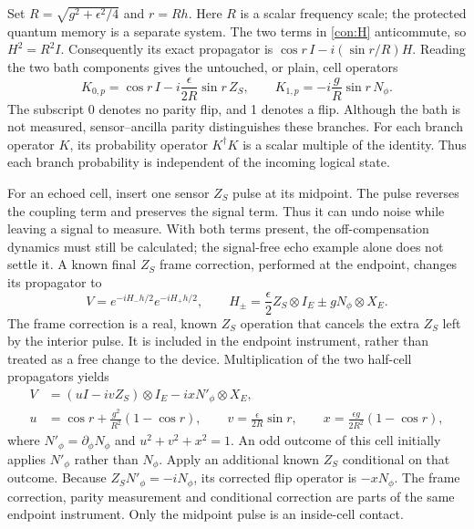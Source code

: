 \documentclass[11pt,a4paper]{article}
\numberwithin{equation}{section}
\theoremstyle{remark}
\begin{document}
Set $R=\sqrt{g^2+\epsilon^2/4}$ and $r=Rh$. Here $R$ is a scalar
frequency scale; the protected quantum memory is a separate system.
The two terms in
\eqref{con:H} anticommute, so $H^2=R^2I$. Consequently its exact propagator
is $\cos r\,I-i(\sin r/R)H$. Reading the two bath components gives the
untouched, or plain, cell operators
\begin{equation}
 K_{0,p}=\cos r\,I-i\frac{\epsilon}{2R}\sin r\,Z_S,
 \qquad K_{1,p}=-i\frac gR\sin r\,N_\phi.
 \label{con:plain}
\end{equation}
The subscript 0 denotes no parity flip, and 1 denotes a flip. Although the
bath is not measured, sensor--ancilla parity distinguishes these branches.
For each branch operator $K$, its probability operator $K^\dagger K$
is a scalar multiple of the identity. Thus each branch probability
is independent of the incoming logical state.

For an echoed cell, insert one sensor $Z_S$ pulse at its midpoint.
The pulse reverses the coupling term and preserves the signal term.
Thus it can undo noise while leaving a signal to measure. With both
terms present, the off-compensation dynamics must still be calculated;
the signal-free echo example alone does not settle it.
A known final $Z_S$ frame correction, performed at the endpoint, changes
its propagator to
\begin{equation}
 V= e^{-iH_-h/2}e^{-iH_+h/2},
 \qquad H_\pm=\frac\epsilon2Z_S\otimes I_E
                   \pm gN_\phi\otimes X_E.
\end{equation}
The frame correction is a real, known $Z_S$ operation that cancels
the extra $Z_S$ left by the interior pulse. It is included in the
endpoint instrument, rather than treated as a free change to the device.
Multiplication of the two half-cell propagators yields
\begin{align}
 V&=(uI-ivZ_S)\otimes I_E-i xN'_\phi\otimes X_E,\nonumber\\
 u&=\cos r+\frac{g^2}{R^2}(1-\cos r),\qquad
 v=\frac\epsilon{2R}\sin r,\qquad
 x=\frac{\epsilon g}{2R^2}(1-\cos r),
 \label{con:echo}
\end{align}
where $N'_\phi=\partial_\phi N_\phi$ and $u^2+v^2+x^2=1$.
An odd outcome of this cell initially applies $N'_\phi$ rather than
$N_\phi$. Apply an additional known $Z_S$ conditional on that outcome.
Because $Z_SN'_\phi=-iN_\phi$, its corrected flip operator is
$-xN_\phi$. The frame correction, parity measurement and conditional
correction are parts of the same endpoint instrument. Only the midpoint
pulse is an inside-cell contact.
\end{document}
